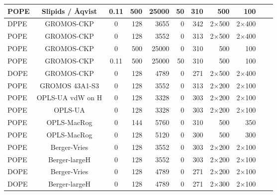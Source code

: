 \documentclass[journal=jpcbfk]{achemso}
\begin{document}
\begin{sidewaystable*}[!p]
\begin{minipage}[t]{\textwidth}
\begin{tabular}{l c c r r r r r r c c}
      POPE  & Slipids / {\AA}qvist \cite{jambeck12b,aqvist90}  & 0.11 & 500 & 25000 & 50  &  310  & 500 & 100 & \cite{POPEslipids150mMNaCl} \\
      \hline
      DPPE  & GROMOS-CKP    \cite{??}      &0    & 128	& 3655  &0    & 342  & 2$\times$500 & 2$\times$400 & \cite{gromosCKPdppe} \\
      POPE  & GROMOS-CKP    \cite{??}      &0    & 128	& 3552  &0    & 313  & 2$\times$500 & 2$\times$400 & \cite{gromosCKPpope} \\
      POPE  & GROMOS-CKP    \cite{??}      &0    & 500	& 25000 &0    & 310  & 500 & 100 & \cite{gromosCKPpopeT310} \\
      POPE  & GROMOS-CKP    \cite{??}      &0.11 & 500	& 25000 &50   & 310  & 500 & 100 & \cite{gromosCKPpopeT310150mMNaCl} \\
      DOPE  & GROMOS-CKP    \cite{??}      &0    & 128	& 4789  &0    & 271  & 2$\times$500 & 2$\times$400 & \cite{gromosCKPdope} \\
      \hline
      POPE  & GROMOS 43A1-S3 \cite{??}     &0    & 128	& 3552     &0    & 313  & 2$\times$200 & 2$\times$100 & \cite{gromos43a1s3POPEfiles}  \\
      \hline
      POPE  & OPLS-UA vdW on H \cite{??}   &0    & 128	& 3328     &0    & 303  & 2$\times$200 & 2$\times$100 & \cite{OPLSuaWvdWPOPEfiles} \\
      POPE  & OPLS-UA \cite{??}            &0    & 128	& 3328     &0    & 303  & 2$\times$200 & 2$\times$100 & \cite{OPLSuaPOPEfiles} \\
      \hline
      POPE  & OPLS-MacRog \cite{rog16}     &0    & 144	& 5760     &0    & 310  & 500 & 350 & \cite{MacRogPOPEfiles} \\
      POPE  & OPLS-MacRog \cite{rog16}     &0    & 128	& 5120     &0    & 300  & 500 & 300 & \cite{MacRogPOPEfilesT300K} \\
      \hline
      POPE  & Berger-Vries \cite{??}       &0    & 128	& 3552  &0    & 303  & 2$\times$200 & 2$\times$100 & \cite{bergerPOPEfiles}  \\
      POPE  & Berger-largeH \cite{??}      &0    & 128	& 3552  &0    & 303  & 2$\times$200 & 2$\times$100 & \cite{berger2POPEfiles}  \\
      DOPE  & Berger-Vries \cite{??}       &0    & 128	& 4789  &0    & 271  & 2$\times$200 & 2$\times$100 & \cite{bergerDOPEfiles}  \\
      DOPE  & Berger-largeH \cite{??}      &0    & 128	& 4789  &0    & 271  & 2$\times$300 & 2$\times$100 & \cite{berger2DOPEfiles} \\ 

\end{tabular}
\end{minipage}
\end{sidewaystable*}
\end{document}
